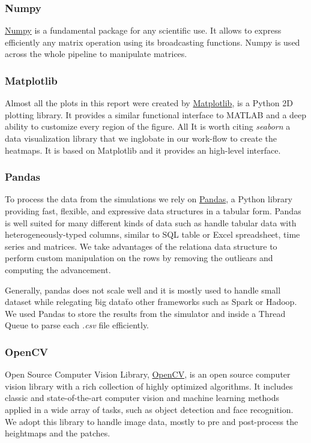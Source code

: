 \documentclass[../document.tex]{subfiles}
\begin{document}
\subsubsection{Numpy}
\href{https://www.numpy.org/}{Numpy} is a fundamental package for any scientific use. It allows to express efficiently any matrix operation using its broadcasting functions. Numpy is used across the whole pipeline to manipulate matrices.

\subsubsection{Matplotlib}
Almost all the plots in this report were created by \href{https://matplotlib.org/}{Matplotlib}, is a Python 2D plotting library. It provides a similar functional interface to MATLAB and a deep ability to customize every region of the figure. All 
It is worth citing \emph{seaborn} a data visualization library that we inglobate in our work-flow to create the heatmaps. It is based on Matplotlib and it provides an high-level interface.
\subsubsection{Pandas}
To process the data from the simulations we rely on \href{https://pandas.pydata.org/}{Pandas}, a Python library providing fast, flexible, and expressive data structures in a tabular form. Pandas is well suited for many different kinds of data such as handle tabular data with heterogeneously-typed columns, similar to SQL table or Excel spreadsheet, time series and matrices. We take advantages of the relationa data structure to perform custom manipulation on the rows by removing the outliears and computing the advancement.

Generally, pandas does not scale well and it is mostly used to handle small dataset while relegating \"big data\" to other frameworks such as Spark or Hadoop. We used Pandas to store the results from the simulator and inside a Thread Queue to parse each \emph{.csv} file efficiently. 

\subsubsection{OpenCV}
Open Source Computer Vision Library, \href{https://opencv.org/}{OpenCV}, is an open source computer vision library with a rich collection of highly optimized algorithms. It includes classic and state-of-the-art computer vision and machine learning methods applied in a wide array of tasks, such as object detection and face recognition. We adopt this library to handle image data, mostly to pre and post-process the heightmaps and the patches.
\end{document}
